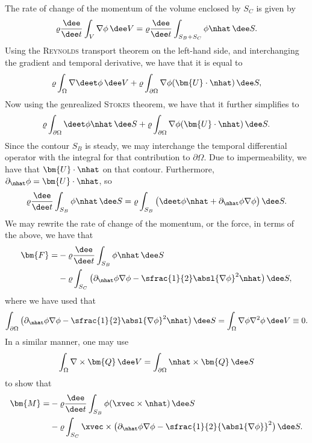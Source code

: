 The rate of change of the momentum of the volume enclosed by $S_C$ is given by
\[
    \varrho \frac{\dee}{\dee t}\int_{V} \nabla\phi \,\dee V = \varrho \frac{\dee}{\dee t}\int_{S_B + S_C} \phi \nhat \,\dee S.
\]
Using the \textsc{Reynolds} transport theorem on the left-hand side, and interchanging the gradient and temporal derivative, we have that it is equal to
\[
    \varrho \int_{\Omega} \nabla\deet\phi \,\dee V + \varrho \int_{\partial\Omega} \nabla\phi (\bm{U} \cdot \nhat) \,\dee S,
\]
Now using the genrealized \textsc{Stokes} theorem, we have that it further simplifies to
\[
    \varrho \int_{\partial\Omega} \deet \phi \nhat \,\dee S + \varrho \int_{\partial\Omega} \nabla\phi (\bm{U} \cdot \nhat) \,\dee S.
\]
Since the contour $S_B$ is steady, we may interchange the temporal differential operator with the integral for that contribution to $\partial\Omega$.
Due to impermeability, we have that $\bm{U} \cdot \nhat$ on that contour.
Furthermore, $\partial_{\nhat} \phi = \bm{U} \cdot \nhat$, so
\[
    \varrho \frac{\dee}{\dee t} \int_{S_B} \phi \nhat \,\dee S = \varrho \int_{S_B} \big( \deet\phi\nhat + \partial_{\nhat} \phi \nabla\phi \big) \,\dee S.
\]
We may rewrite the rate of change of the momentum, or the force, in terms of the above, we have that
\begin{equation*}
    \begin{aligned}
        \bm{F} = & - \varrho \frac{\dee}{\dee t} \int_{S_B} \phi \nhat \,\dee S\\
        & - \varrho\int_{S_C} \big( \partial_{\nhat} \phi \nabla\phi - \sfrac{1}{2}\absl{\nabla \phi}^2 \nhat \big) \,\dee S,
    \end{aligned}
\end{equation*}
where we have used that
\[
    \int_{\partial\Omega} \big( \partial_{\nhat}\phi \nabla\phi - \sfrac{1}{2}\absl{\nabla \phi}^2 \nhat \big) \,\dee S = \int_{\Omega} \nabla\phi \nabla^2 \phi \,\dee V \equiv 0.
\]
In a similar manner, one may use
\[
    \int_{\Omega} \nabla\times\bm{Q} \,\dee V = \int_{\partial\Omega} \nhat\times\bm{Q} \,\dee S
\]
to show that
\begin{equation*}
    \begin{aligned}
        \bm{M} = & - \varrho \frac{\dee}{\dee t}\int_{S_B} \phi (\xvec\times\nhat) \,\dee S\\
        & - \varrho \int_{S_C} \xvec\times \big( \partial_{\nhat} \phi \nabla\phi - \sfrac{1}{2}{\absl{\nabla\phi}}^2 \big) \,\dee S.
    \end{aligned}
\end{equation*}